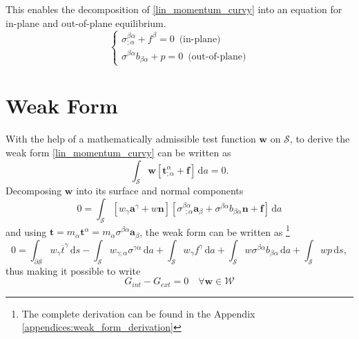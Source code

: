 This enables the decomposition of \eqref{lin_momentum_curvy} into an equation for in-plane and out-of-plane equilibrium.
\begin{equation}\label{lin_momentum_curvy_decomposition}
    \begin{cases}
        \sigma^{\beta \alpha}_{;\alpha} + f^{\beta} = 0 \,\,\, \text{(in-plane)}\\
        \sigma^{\beta \alpha} b_{\beta \alpha} + p = 0 \, \, \, \text{(out-of-plane)}
    \end{cases}
\end{equation}
\linebreak
\section{Weak Form} \label{sec:curvy_weak_form}
With the help of a mathematically admissible test function $\boldsymbol{w}$ on $\mathcal{S}$, to derive the weak form \eqref{lin_momentum_curvy} can be written as  
\begin{equation}\label{weak_form_1}
    \int_{\mathcal{S}} \boldsymbol{w} \left[ \boldsymbol{t}_{; \alpha}^{\alpha} + \boldsymbol{f} \right] \, \mathrm{d} a = 0.
\end{equation}
Decomposing $\boldsymbol{w}$ into its surface and normal components     
\begin{equation}\label{weak_form_2}
    0 = \int_{\mathcal{S}} \left[ w_{\gamma} \boldsymbol{a}^{\gamma} + w \boldsymbol{n} \right] \left[ \sigma_{~~; \alpha}^{\beta \alpha} \boldsymbol{a}_{\beta} + \sigma^{\beta \alpha} b_{\beta \alpha} \boldsymbol{n} + \boldsymbol{f} \right] \, \mathrm{d} a
\end{equation}
and using $ \boldsymbol{t} = m_{\alpha} \boldsymbol{t}^{\alpha} = m_{\alpha} \sigma^{\beta \alpha} \boldsymbol{a}_{\beta} $,
 the weak form can be written as \footnote{The complete derivation can be found in the Appendix \ref{appendices:weak_form_derivation}}  
    \begin{equation}\label{weak_form_curvy}
    0 = \int_{\partial \mathcal{S}} w_{\gamma} \overline{t}^{\gamma} \, \mathrm{d} s - \int_{\mathcal{S}} w_{\gamma ; \alpha} \sigma^{\gamma \alpha} \, \mathrm{d} a + \int_{\mathcal{S}} w_{\gamma} f^{\gamma} \, \mathrm{d} a + \int_{\mathcal{S}} w \sigma^{\beta \alpha} b_{\beta \alpha} \, \mathrm{d} a + \int_{\mathcal{S}} w p \, \mathrm{d} s,
    \end{equation}  
thus making it possible to write
    \begin{equation}\label{eq:weak_8}
        G_{int} - G_{ext} = 0 \quad \forall \boldsymbol{w} \in \mathcal{W}
    \end{equation}
